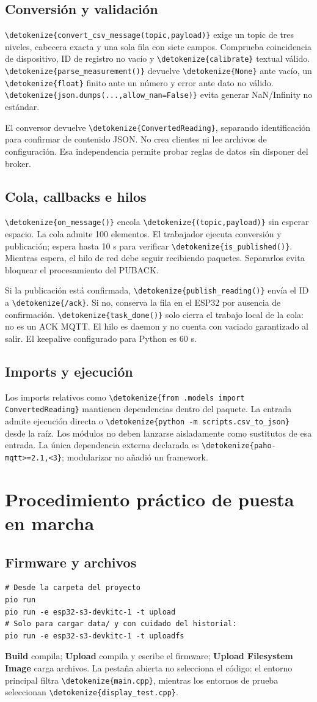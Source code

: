 \documentclass[11pt,a4paper]{article}
\newcommand{\code}[1]{\expandafter\nolinkurl\expandafter{\detokenize{#1}}}
\newcommand{\nextsection}[1]{\clearpage\section{#1}}
\begin{document}
\subsection{Conversión y validación}
\code{convert_csv_message(topic,payload)} exige un topic de tres niveles, cabecera exacta y una sola fila con siete campos. Comprueba coincidencia de dispositivo, ID de registro no vacío y \code{calibrate} textual válido. \code{parse_measurement()} devuelve \code{None} ante vacío, un \code{float} finito ante un número y error ante dato no válido. \code{json.dumps(...,allow_nan=False)} evita generar NaN/Infinity no estándar.

El conversor devuelve \code{ConvertedReading}, separando identificación para confirmar de contenido JSON. No crea clientes ni lee archivos de configuración. Esa independencia permite probar reglas de datos sin disponer del broker.

\subsection{Cola, callbacks e hilos}
\code{on_message()} encola \code{(topic,payload)} sin esperar espacio. La cola admite 100 elementos. El trabajador ejecuta conversión y publicación; espera hasta 10 s para verificar \code{is_published()}. Mientras espera, el hilo de red debe seguir recibiendo paquetes. Separarlos evita bloquear el procesamiento del PUBACK.\cite{paho}

Si la publicación está confirmada, \code{publish_reading()} envía el ID a \code{/ack}. Si no, conserva la fila en el ESP32 por ausencia de confirmación. \code{task_done()} solo cierra el trabajo local de la cola: no es un ACK MQTT. El hilo es daemon y no cuenta con vaciado garantizado al salir. El keepalive configurado para Python es 60 s.

\subsection{Imports y ejecución}
Los imports relativos como \code{from .models import ConvertedReading} mantienen dependencias dentro del paquete. La entrada admite ejecución directa o \code{python -m scripts.csv_to_json} desde la raíz. Los módulos no deben lanzarse aisladamente como sustitutos de esa entrada. La única dependencia externa declarada es \code{paho-mqtt>=2.1,<3}; modularizar no añadió un framework.

\nextsection{Procedimiento práctico de puesta en marcha}
\subsection{Firmware y archivos}
\begin{lstlisting}
# Desde la carpeta del proyecto
pio run
pio run -e esp32-s3-devkitc-1 -t upload
# Solo para cargar data/ y con cuidado del historial:
pio run -e esp32-s3-devkitc-1 -t uploadfs
\end{lstlisting}
\textbf{Build} compila; \textbf{Upload} compila y escribe el firmware; \textbf{Upload Filesystem Image} carga archivos. La pestaña abierta no selecciona el código: el entorno principal filtra \code{main.cpp}, mientras los entornos de prueba seleccionan \code{display_test.cpp}.
\end{document}
